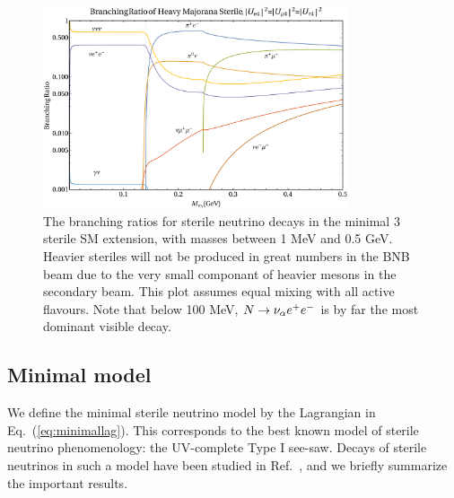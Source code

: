 \documentclass[11pt, a4paper]{article}
\newcommand{\refeq}[1]{Eq.~(\ref{#1})}
\newcommand{\refref}[1]{Ref.~\cite{#1}}
\def\ster{\ensuremath N}
\begin{document}
\begin{figure}[t]
%
\centering
%
\includegraphics[width=0.8\textwidth]{figures/bounds1.pdf}
%
%
\caption{\label{fig:branchingratios}The branching ratios for sterile neutrino
decays in the minimal 3 sterile SM extension, with masses between 1 MeV and 0.5
GeV. Heavier steriles will not be produced in great numbers in the BNB beam due
to the very small componant of heavier mesons in the secondary beam. This plot
assumes equal mixing with all active flavours. Note that below 100 MeV, $\ster
\rightarrow \nu_\alpha e^+ e^-$ is by far the most dominant visible decay.}
%
\end{figure}

\subsection{Minimal model}

We define the minimal sterile neutrino model by the Lagrangian in
\refeq{eq:minimallag}. This corresponds to the best known model of sterile
neutrino phenomenology: the UV-complete Type I see-saw. Decays of sterile
neutrinos in such a model have been studied in \refref{Atre:2009rg}, and we
briefly summarize the important results.
\end{document}
